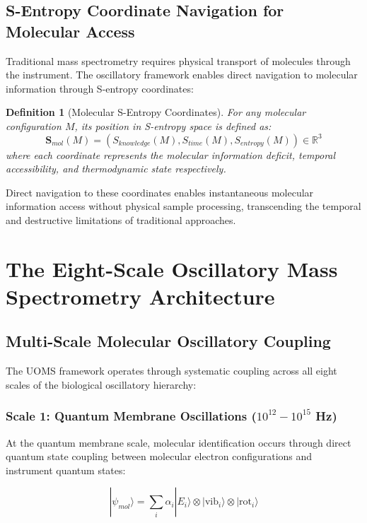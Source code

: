\documentclass[12pt,a4paper]{article}
\newtheorem{definition}[theorem]{Definition}
\begin{document}
\subsection{S-Entropy Coordinate Navigation for Molecular Access}

Traditional mass spectrometry requires physical transport of molecules through the instrument. The oscillatory framework enables direct navigation to molecular information through S-entropy coordinates:

\begin{definition}[Molecular S-Entropy Coordinates]
For any molecular configuration $M$, its position in S-entropy space is defined as:
\begin{equation}
\mathbf{S}_{mol}(M) = (S_{knowledge}(M), S_{time}(M), S_{entropy}(M)) \in \mathbb{R}^3
\end{equation}
where each coordinate represents the molecular information deficit, temporal accessibility, and thermodynamic state respectively.
\end{definition}

Direct navigation to these coordinates enables instantaneous molecular information access without physical sample processing, transcending the temporal and destructive limitations of traditional approaches.

\section{The Eight-Scale Oscillatory Mass Spectrometry Architecture}

\subsection{Multi-Scale Molecular Oscillatory Coupling}

The UOMS framework operates through systematic coupling across all eight scales of the biological oscillatory hierarchy:

\subsubsection{Scale 1: Quantum Membrane Oscillations ($10^{12}-10^{15}$ Hz)}

At the quantum membrane scale, molecular identification occurs through direct quantum state coupling between molecular electron configurations and instrument quantum states:

\begin{equation}
|\psi_{mol}\rangle = \sum_i \alpha_i |E_i\rangle \otimes |\text{vib}_i\rangle \otimes |\text{rot}_i\rangle
\end{equation}
\end{document}

